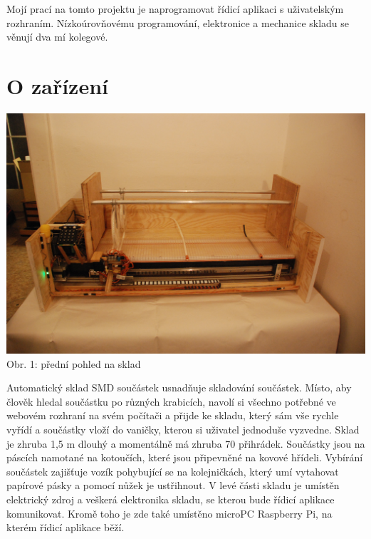 \documentclass[12pt, a4paper, oneside]{article}
\begin{document}
Mojí prací na tomto projektu je naprogramovat řídicí aplikaci s uživatelským rozhraním. Nízkoúrovňovému programování, elektronice a mechanice skladu se věnují dva mí kolegové.




\newpage

\section{O zařízení}


\begin{minipage}{\textwidth}
\begin{center}
\includegraphics[scale=0.40]{img/sklad.JPG}
\\
\caption{Obr. 1: přední pohled na sklad}
\end{center}
\end{minipage}
\vspace{4mm}

Automatický sklad SMD součástek usnadňuje skladování součástek. Místo, aby člověk hledal součástku po různých krabicích, navolí si všechno potřebné ve webovém rozhraní na svém počítači a přijde ke skladu, který sám vše rychle vyřídí a součástky vloží do vaničky, kterou si uživatel jednoduše vyzvedne.
Sklad je zhruba 1,5 m dlouhý a momentálně má zhruba 70 přihrádek. Součástky jsou na páscích namotané na kotoučích, které jsou připevněné na kovové hřídeli. Vybírání součástek zajišťuje vozík pohybující se na kolejničkách, který umí vytahovat papírové pásky a pomocí nůžek je ustřihnout. V levé části skladu je umístěn elektrický zdroj a veškerá elektronika skladu, se kterou bude řídicí aplikace komunikovat. Kromě toho je zde také umístěno microPC Raspberry Pi, na kterém řídicí aplikace běží.
\end{document}
